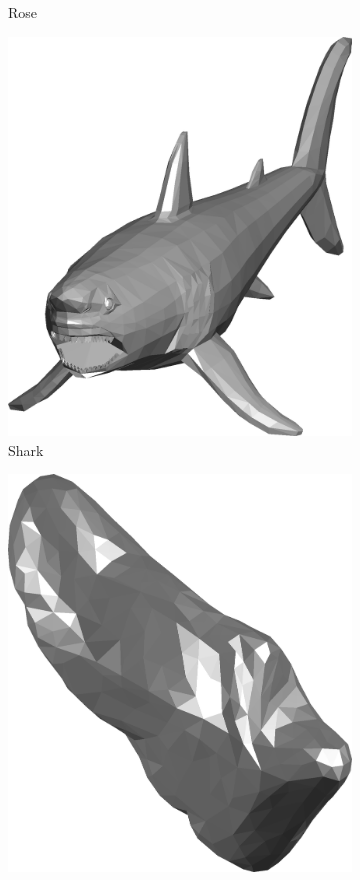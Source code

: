 \begin{figure}
\begin{subfigure}[t]{0.19\linewidth}
		\caption{Rose} 	
	\end{subfigure}
	\begin{subfigure}[t]{0.19\linewidth} \centering
		\includegraphics[width=1\linewidth]{./fig/eval/19shark.png}  
		\caption{Shark} 	
	\end{subfigure} 
	\begin{subfigure}[t]{0.19\linewidth} \centering
		\includegraphics[width=1\linewidth]{./fig/eval/20shoe.png}  

\end{subfigure}
\end{figure}
